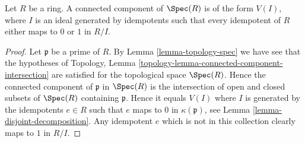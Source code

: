 \begin{lemma}
\label{lemma-connected-component}
Let $R$ be a ring.
A connected component of
$\Spec(R)$ is of the form $V(I)$,
where $I$ is an ideal generated by idempotents
such that every idempotent of $R$ either maps to
$0$ or $1$ in $R/I$.
\end{lemma}

\begin{proof}
Let $\mathfrak p$ be a prime of $R$. By
Lemma \ref{lemma-topology-spec}
we have see that the hypotheses of
Topology, Lemma \ref{topology-lemma-connected-component-intersection}
are satisfied for the topological space $\Spec(R)$.
Hence the connected component of $\mathfrak p$ in $\Spec(R)$
is the intersection of open and closed subsets of $\Spec(R)$
containing $\mathfrak p$. Hence it equals $V(I)$ where
$I$ is generated by the idempotents $e \in R$ such that $e$ maps to $0$
in $\kappa(\mathfrak p)$, see
Lemma \ref{lemma-disjoint-decomposition}.
Any idempotent $e$ which is not in this collection clearly maps to $1$
in $R/I$.
\end{proof}